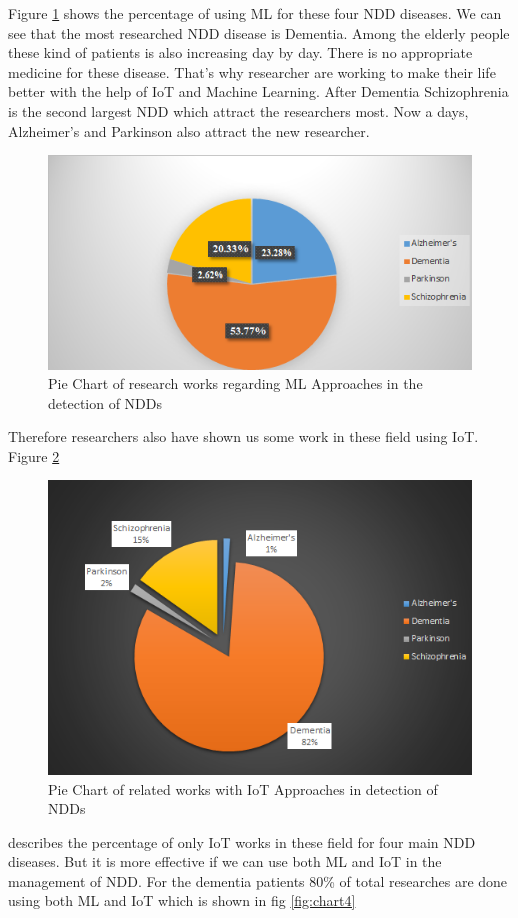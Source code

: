  Figure \ref{fig:chart2} shows the  percentage of using ML for these four NDD diseases. We can see that the most researched NDD disease is Dementia. Among the elderly people these kind of patients is also increasing day by day. There is no appropriate medicine for these disease. That's why researcher are working to make their life better with the help of IoT and Machine Learning. After Dementia Schizophrenia is the second largest NDD which attract the researchers most. Now a days, Alzheimer's and Parkinson also attract the new researcher.  
 \begin{figure}[ht]
   \centering
   \includegraphics[width=5.5in]{Chap2/chart2.png}
   \caption{Pie Chart of research works regarding ML Approaches in the detection of NDDs }
   \label{fig:chart2}
\end{figure}Therefore researchers also have shown us some work in these field using IoT. Figure \ref{fig:chart3}
 \begin{figure}[ht]
   \centering
   \includegraphics[width=5.5in]{Chap2/chart3.png}
   \caption{Pie Chart of related works with IoT Approaches in detection of NDDs}
   \label{fig:chart3}
\end{figure}describes the percentage of only IoT works in these field for four main NDD diseases. But it is more effective if we can use both ML and IoT in the management of NDD. For the dementia patients 80\% of total  researches are done using both ML and IoT which is shown in fig \ref{fig:chart4}
